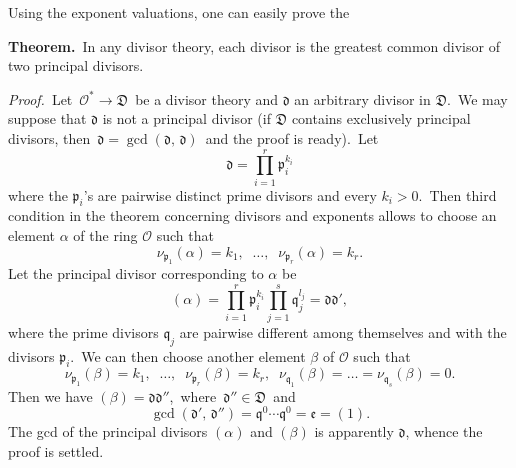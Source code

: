 \documentclass[12pt]{article}
\theoremstyle{definition}
\begin{document}
Using the exponent valuations, one can easily prove the

\textbf{Theorem.}\, In any divisor theory, each divisor is the greatest common divisor of two principal divisors.

{\em Proof.}\, Let\, $\mathcal{O}^* \to \mathfrak{D}$\, be a divisor theory and $\mathfrak{d}$ an arbitrary divisor in $\mathfrak{D}$.\, We may suppose that $\mathfrak{d}$ is not a principal divisor (if $\mathfrak{D}$ contains exclusively principal divisors, then\, $\mathfrak{d} = \gcd(\mathfrak{d},\,\mathfrak{d})$\, and the proof is ready).\, Let 
$$\mathfrak{d} = \prod_{i=1}^r\mathfrak{p}_i^{k_i}$$
where the $\mathfrak{p}_i$'s are pairwise distinct prime divisors and every $k_i > 0$.\, Then third condition in the theorem concerning divisors and exponents allows to choose an element $\alpha$ of the ring $\mathcal{O}$ such that
$$\nu_{\mathfrak{p}_1}(\alpha) = k_1,\;\;\ldots,\;\;\nu_{\mathfrak{p}_r}(\alpha) = k_r.$$
Let the principal divisor corresponding to $\alpha$ be
$$(\alpha) = \prod_{i=1}^r\mathfrak{p}_i^{k_i}\prod_{j=1}^s\mathfrak{q}_j^{l_j} = \mathfrak{dd}',$$
where the prime divisors $\mathfrak{q}_j$ are pairwise different among themselves and with the divisors $\mathfrak{p}_i$.\, We can then choose another element $\beta$ of $\mathcal{O}$ such that
$$\nu_{\mathfrak{p}_1}(\beta) = k_1,\;\;\ldots,\;\;\nu_{\mathfrak{p}_r}(\beta) = k_r,\;\; 
\nu_{\mathfrak{q}_1}(\beta) = \ldots = \nu_{\mathfrak{q}_s}(\beta) = 0.$$
Then we have\; $(\beta) = \mathfrak{dd}''$,\, where\, $\mathfrak{d}'' \in \mathfrak{D}$\, and
$$\gcd(\mathfrak{d}',\,\mathfrak{d}'') = \mathfrak{q}^0\cdots\mathfrak{q}^0 = \mathfrak{e} = (1).$$
The gcd of the principal divisors $(\alpha)$ and $(\beta)$ is apparently $\mathfrak{d}$, whence the proof is settled.
\end{document}
